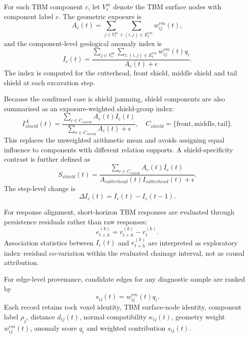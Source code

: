 For each TBM component $c$, let $V_c^m$ denote the TBM surface nodes with component label $c$. The geometric exposure is
\begin{equation}
A_c(t)=\sum_{j\in V_c^m}\sum_{i:(i,j)\in E_t^{rm}} w_{ij}^{rm}(t),
\end{equation}
and the component-level geological anomaly index is
\begin{equation}
I_c(t)=\frac{\sum_{j\in V_c^m}\sum_{i:(i,j)\in E_t^{rm}}w_{ij}^{rm}(t)q_i}{A_c(t)+\epsilon}.
\end{equation}
The index is computed for the cutterhead, front shield, middle shield and tail shield at each excavation step.

Because the confirmed case is shield jamming, shield components are also summarised as an exposure-weighted shield-group index:
\begin{equation}
I_{shield}^{A}(t)=\frac{\sum_{c\in C_{shield}}A_c(t)I_c(t)}{\sum_{c\in C_{shield}}A_c(t)+\epsilon},
\quad C_{shield}=\{\mathrm{front},\mathrm{middle},\mathrm{tail}\}.
\end{equation}
This replaces the unweighted arithmetic mean and avoids assigning equal influence to components with different relation supports. A shield-specificity contrast is further defined as
\begin{equation}
S_{shield}(t)=\frac{\sum_{c\in C_{shield}}A_c(t)I_c(t)}{A_{cutterhead}(t)I_{cutterhead}(t)+\epsilon}.
\end{equation}
The step-level change is
\begin{equation}
\Delta I_c(t)=I_c(t)-I_c(t-1).
\end{equation}

For response alignment, short-horizon TBM responses are evaluated through persistence residuals rather than raw responses:
\begin{equation}
e_{t+h}^{(k)}=r_{t+h}^{(k)}-r_t^{(k)}.
\end{equation}
Association statistics between $I_c(t)$ and $e_{t+h}^{(k)}$ are interpreted as exploratory index--residual co-variation within the evaluated chainage interval, not as causal attribution.

For edge-level provenance, candidate edges for any diagnostic sample are ranked by
\begin{equation}
s_{ij}(t)=w_{ij}^{rm}(t)q_i.
\end{equation}
Each record retains rock voxel identity, TBM surface-node identity, component label $\rho_j$, distance $d_{ij}(t)$, normal compatibility $\kappa_{ij}(t)$, geometry weight $w_{ij}^{rm}(t)$, anomaly score $q_i$ and weighted contribution $s_{ij}(t)$.

